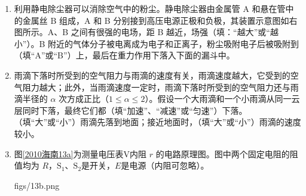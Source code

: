 \documentclass[\gkver]{gaokaozhenti}
\begin{document}
\begin{enumerate}
\item
利用静电除尘器可以消除空气中的粉尘。静电除尘器由金属管 A 和悬在管中的金属丝 B 组成，A 和 B 分别接到高压电源正极和负极，其装置示意图如右图所示。A、B 之间有很强的电场，距 B 越近，场强（填：“越大”或“越小”）。B 附近的气体分子被电离成为电子和正离子，粉尘吸附电子后被吸附到（填“A”或“B”）上，最后在重力作用下落入下面的漏斗中。



\item
雨滴下落时所受到的空气阻力与雨滴的速度有关，雨滴速度越大，它受到的空气阻力越大；此外，当雨滴速度一定时，雨滴下落时所受到的空气阻力还与雨滴半径的 $\alpha$ 次方成正比（$1\leqslant\alpha\leqslant2$）。假设一个大雨滴和一个小雨滴从同一云层同时下落，最终它们都（填“加速”、“减速”或“匀速”）下落。（填“大”或“小”）雨滴先落到地面；接近地面时，（填“大”或“小”）雨滴的速度较小。


\item
图\ref{2010海南13a}为测量电压表V内阻 $r$ 的电路原理图。图中两个固定电阻的阻值均为 $R$，$\mathrm{S}_{1}$、$\mathrm{S}_{2}$是开关，$E$是电源（内阻可忽略）。

{figs/13b.png}


\end{enumerate}
\end{document}

